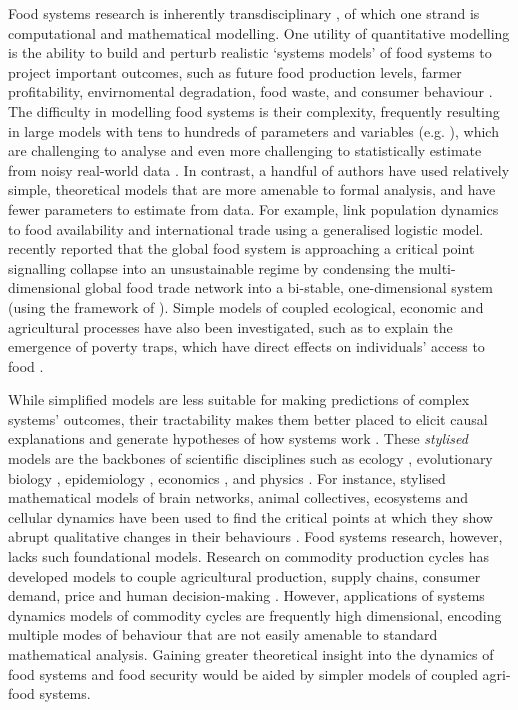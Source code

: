 \documentclass[12pt]{article}
\begin{document}
Food systems research is inherently transdisciplinary \cite{drimie2013,hammond2012}, of which one strand is computational and mathematical modelling. One utility of quantitative modelling is the ability to build and perturb realistic `systems models' of food systems to project important outcomes, such as future food production levels, farmer profitability, envirnomental degradation, food waste, and consumer behaviour \cite{springmann2018,marchand2016,sampedro2020,suweis2015,scalco2019,allen2016}. The difficulty in modelling food systems is their complexity, frequently resulting in large models with tens to hundreds of parameters and variables (e.g. \cite{sampedro2020,springmann2018}), which are challenging to analyse and even more challenging to statistically estimate from noisy real-world data \cite{sterman2000}. In contrast, a handful of authors have used relatively simple, theoretical models that are more amenable to formal analysis, and have fewer parameters to estimate from data. For example, \cite{suweis2015} link population dynamics to food availability and international trade using a generalised logistic model. \cite{tu2019} recently reported that the global food system is approaching a critical point signalling collapse into an unsustainable regime by condensing the multi-dimensional global food trade network into a bi-stable, one-dimensional system (using the framework of \cite{gao2016}). Simple models of coupled ecological, economic and agricultural processes have also been investigated, such as to explain the emergence of poverty traps, which have direct effects on individuals' access to food \cite{ngonghala2017}.

While simplified models are less suitable for making predictions of complex systems' outcomes, their tractability makes them better placed to elicit causal explanations and generate hypotheses of how systems work \cite{smaldino2017,smaldino2019,otto2020}. These \textit{stylised} models are the backbones of scientific disciplines such as ecology \cite{may1973}, evolutionary biology \cite{boyd2003}, epidemiology \cite{kermack1927}, economics \cite{nerlove1958}, and physics \cite{strogatz1994}. For instance, stylised mathematical models of brain networks, animal collectives, ecosystems and cellular dynamics have been used to find the critical points at which they show abrupt qualitative changes in their behaviours \cite{sole1996,scheffer2001}. Food systems research, however, lacks such foundational models. Research on commodity production cycles has developed models to couple agricultural production, supply chains, consumer demand, price and human decision-making \cite{meadows1971,sterman2000}. However, applications of systems dynamics models of commodity cycles are frequently high dimensional, encoding multiple modes of behaviour that are not easily amenable to standard mathematical analysis. Gaining greater theoretical insight into the dynamics of food systems and food security would be aided by simpler models of coupled agri-food systems.
\end{document}
